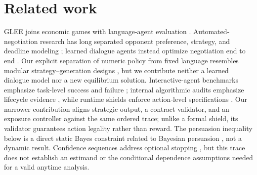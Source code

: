 \section{Related work}

GLEE joins economic games with language-agent evaluation
\citep{shapira2024glee}. Automated-negotiation research has long separated
opponent preference, strategy, and deadline modeling \citep{baarslag2016opponent};
learned dialogue agents instead optimize negotiation end to end
\citep{lewis2017deal}. Our explicit separation of numeric policy from fixed
language resembles modular strategy--generation designs
\citep{he2018decoupling}, but we contribute neither a learned dialogue model nor
a new equilibrium solution. Interactive-agent benchmarks emphasize task-level
success and failure \citep{liu2024agentbench}; internal algorithmic audits
emphasize lifecycle evidence \citep{raji2020accountability}, while runtime
shields enforce action-level specifications \citep{alshiekh2018shielding}. Our
narrower contribution aligns strategic output, a contract validator, and an
exposure controller against the same ordered trace; unlike a formal shield, its
validator guarantees action legality rather than reward. The persuasion
inequality below is a direct static Bayes constraint related to Bayesian
persuasion \citep{kamenica2011bayesian}, not a dynamic result. Confidence
sequences address optional stopping \citep{howard2021confidence}, but this trace
does not establish an estimand or the conditional dependence assumptions needed
for a valid anytime analysis.
